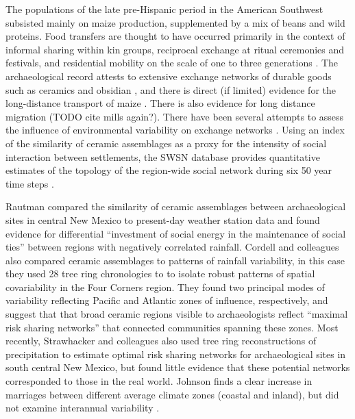\documentclass[10pt]{iopart}
\begin{document}
The populations of the late pre-Hispanic period in the American Southwest subsisted mainly on maize production, supplemented by a mix of beans and wild proteins. Food transfers are thought to have occurred primarily in the context of informal sharing within kin groups, reciprocal exchange at ritual ceremonies and festivals, and residential mobility on the scale of one to three generations \parencite{Hegmon1991,Hegmon1996,Kohler1996TheAnasazi,Varien1999SedentismBeyond,Cordell2007MesaMigration}. The archaeological record attests to extensive exchange networks of durable goods such as ceramics and obsidian \parencite{Mills2013a}, and there is direct (if limited) evidence for the long-distance transport of maize \parencite{Benson2009PossibleMexico,Benson2010WhoDrought}. There is also evidence for long distance migration (TODO cite mills again?). There have been several attempts to assess the influence of environmental variability on exchange networks \parencite{Rautman1993,Cordell2007,Strawhacker2017RiskProvince}.  Using an index of the similarity of ceramic assemblages as a proxy for the intensity of social interaction between settlements, the SWSN database provides quantitative estimates of the topology of the region-wide social network during six 50 year time steps \parencite{Mills2013a}.

Rautman \parencite{Rautman1993a} compared the similarity of ceramic assemblages between archaeological sites in central New Mexico to present-day weather station data and found evidence for differential ``investment of social energy in the maintenance of social ties'' between regions with negatively correlated rainfall. Cordell and colleagues \parencite{Cordell2007} also compared ceramic assemblages to patterns of rainfall variability, in this case they used 28 tree ring chronologies to to isolate robust patterns of spatial covariability in the Four Corners region. They found two principal modes of variability reflecting Pacific and Atlantic zones of influence, respectively, and suggest that that broad ceramic regions visible to archaeologists reflect ``maximal risk sharing networks'' that connected communities spanning these zones. Most recently, Strawhacker and colleagues \parencite{Strawhacker2017RiskProvince} also used tree ring reconstructions of precipitation to estimate optimal risk sharing networks for archaeological sites in south central New Mexico, but found little evidence that these potential networks corresponded to those in the real world. Johnson finds a clear increase in marriages between different average climate zones (coastal and inland), but did not examine interannual variability \parencite{Johnson1990ChumashAnalysis}.
\end{document}
